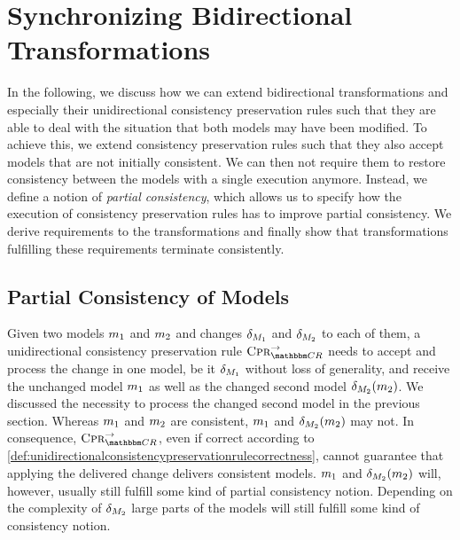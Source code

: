 \section{Synchronizing Bidirectional Transformations}

In the following, we discuss how we can extend bidirectional transformations and especially their unidirectional consistency preservation rules such that they are able to deal with the situation that both models may have been modified.
To achieve this, we extend consistency preservation rules such that they also accept models that are not initially consistent.
We can then not require them to restore consistency between the models with a single execution anymore.
Instead, we define a notion of \emph{partial consistency}, which allows us to specify how the execution of consistency preservation rules has to improve partial consistency.
We derive requirements to the transformations and finally show that transformations fulfilling these requirements terminate consistently.


\subsection{Partial Consistency of Models}

Given two models $m_{1}$ and $m_{2}$ and changes $\delta_{M_{1}}$ and $\delta_{M_{2}}$ to each of them, a unidirectional consistency preservation rule $\consistencypreservationrule{\consistencyrelationset{CR}}^{\rightarrow}$ needs to accept and process the change in one model, be it $\delta_{M_{1}}$ without loss of generality, and receive the unchanged model $m_{1}$ as well as the changed second model $\delta_{M_{2}}(m_{2})$.
We discussed the necessity to process the changed second model in the previous section.
Whereas $m_{1}$ and $m_{2}$ are consistent, $m_{1}$ and $\delta_{M_{2}}(m_{2})$ may not.
In consequence, $\consistencypreservationrule{\consistencyrelationset{CR}}^{\rightarrow}$, even if correct according to \autoref{def:unidirectionalconsistencypreservationrulecorrectness}, cannot guarantee that applying the delivered change delivers consistent models.
$m_{1}$ and $\delta_{M_{2}}(m_{2})$ will, however, usually still fulfill some kind of partial consistency notion.
Depending on the complexity of $\delta_{M_{2}}$ large parts of the models will still fulfill some kind of consistency notion.

